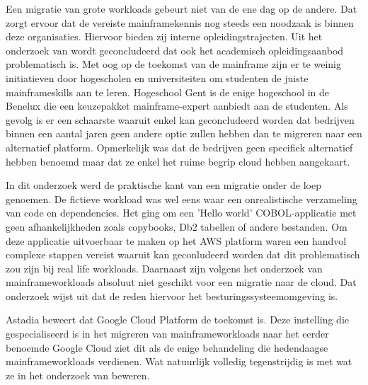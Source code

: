 Een migratie van grote workloads gebeurt niet van de ene dag op de andere. Dat zorgt ervoor dat de vereiste mainframekennis nog steeds een noodzaak is binnen deze organisaties. Hiervoor bieden zij interne opleidingstrajecten. Uit het onderzoek van \textcite{2020} wordt geconcludeerd dat ook het academisch opleidingsaanbod problematisch is. Met oog op de toekomst van de mainframe zijn er te weinig initiatieven door hogescholen en universiteiten om studenten de juiste mainframeskills aan te leren. Hogeschool Gent is de enige hogeschool in de Benelux die een keuzepakket mainframe-expert aanbiedt aan de studenten. Als gevolg is er een schaarste waaruit enkel kan geconcludeerd worden dat bedrijven binnen een aantal jaren geen andere optie zullen hebben dan te migreren naar een alternatief platform. Opmerkelijk was dat de bedrijven geen specifiek alternatief hebben benoemd maar dat ze enkel het ruime begrip cloud hebben aangekaart. 

In dit onderzoek werd de praktische kant van een migratie onder de loep genoemen. De fictieve workload was wel eens waar een onrealistische verzameling van code en dependencies. Het ging om een 'Hello world' COBOL-applicatie met geen afhankelijkheden zoals copybooks, Db2 tabellen of andere bestanden. Om deze applicatie uitvoerbaar te maken op het AWS platform waren een handvol complexe stappen vereist waaruit kan geconludeerd worden dat dit problematisch zou zijn bij real life workloads. Daarnaast zijn volgens het onderzoek van \textcite{Allison2016} mainframeworkloads absoluut niet geschikt voor een migratie naar de cloud. Dat onderzoek wijst uit dat de reden hiervoor het besturingssysteemomgeving is. 

Astadia beweert dat Google Cloud Platform de toekomst is. Deze instelling die gespecialiseerd is in het migreren van mainframeworkloads naar het eerder benoemde Google Cloud ziet dit als de enige behandeling die hedendaagse mainframeworkloads verdienen. Wat natuurlijk volledig tegenstrijdig is met wat ze in het onderzoek van \textcite{Allison2016} beweren.




